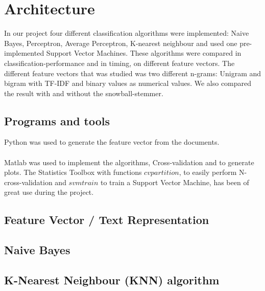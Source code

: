 \chapter{Architecture}
In our project four different classification algorithms were implemented: Naive Bayes, Perceptron, Average Perceptron, K-nearest neighbour and used one pre-implemented Support Vector Machines. 
These algorithms were compared in classification-performance and in timing, on different feature vectors.
The different feature vectors that was studied was two different n-grams: Unigram and bigram with TF-IDF and binary values as numerical values. We also compared the result with and without the snowball-stemmer.
\section{Programs and tools}
Python was used to generate the feature vector from the documents. 
\\\\
Matlab was used to implement the algorithms, Cross-validation and to generate plots. The Statistics Toolbox with functions $cvpartition$, to easily perform N-cross-validation and $svmtrain$ to train a Support Vector Machine, has been of great use during the project.

\section{Feature Vector / Text Representation}

\section{Naive Bayes}


\section{K-Nearest Neighbour (KNN) algorithm}


